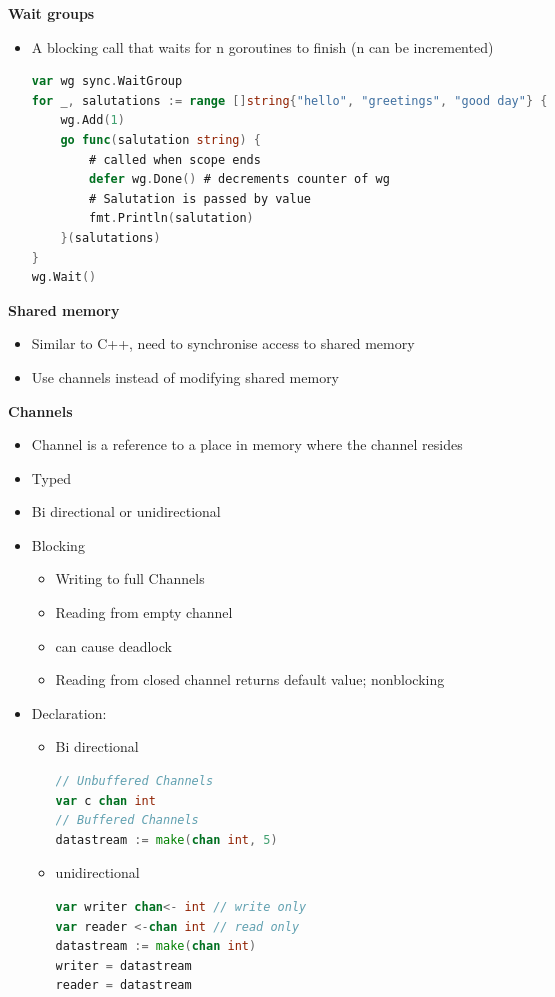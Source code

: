 \documentclass[10pt, landscape]{article}
\begin{document}
\begin{multicols}{4}
\textbf{Wait groups} \\
\begin{itemize}
    \item A blocking call that waits for n goroutines to finish (n can be incremented)
\begin{lstlisting}[language=Go, breaklines=true, breakatwhitespace=true]
var wg sync.WaitGroup
for _, salutations := range []string{"hello", "greetings", "good day"} {
    wg.Add(1)
    go func(salutation string) {
        # called when scope ends
        defer wg.Done() # decrements counter of wg
        # Salutation is passed by value
        fmt.Println(salutation)
    }(salutations)
}
wg.Wait()
\end{lstlisting}
\end{itemize}

\textbf{Shared memory} \\ 
\begin{itemize}
    \item Similar to C++, need to synchronise access to shared memory 
    \item Use channels instead of modifying shared memory
\end{itemize}

\textbf{Channels} \\ 
\begin{itemize}
    \item Channel is a reference to a place in memory where the channel resides 
    \item Typed 
    \item Bi directional or unidirectional
    \item Blocking 
    \begin{itemize}
        \item Writing to full Channels
        \item Reading from empty channel 
        \item can cause deadlock
        \item Reading from closed channel returns default value; nonblocking
    \end{itemize}
    \item Declaration:
    \begin{itemize}
        \item Bi directional 
        \begin{lstlisting}[language=Go, breaklines=true, breakatwhitespace=true]
// Unbuffered Channels
var c chan int
// Buffered Channels
datastream := make(chan int, 5)    
        \end{lstlisting}
        \item unidirectional
        \begin{lstlisting}[language=Go, breaklines=true, breakatwhitespace=true]
var writer chan<- int // write only
var reader <-chan int // read only
datastream := make(chan int)
writer = datastream
reader = datastream
        \end{lstlisting}
    \end{itemize}
\end{itemize}


\end{multicols}
\end{document}

